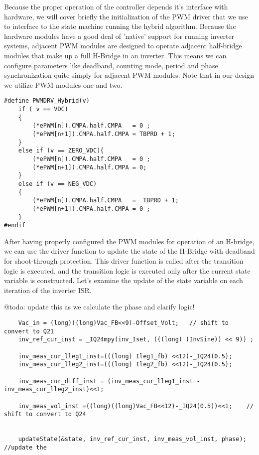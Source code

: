 Because the proper operation of the controller depends it's interface with hardware, we will cover briefly the initialization of the PWM driver that we use to interface to the state machine running the hybrid algorithm. Because the hardware modules have a good deal of 'native' support for running inverter systems, adjacent PWM modules are designed to operate adjacent half-bridge modules that make up a full H-Bridge in an inverter. This means we can configure parameters like deadband, counting mode, period and phase synchronization quite simply for adjacent PWM modules. Note that in our design we utilize PWM modules one and two. 

\begin{lstlisting}
#define PWMDRV_Hybrid(v)
	if ( v == VDC)
	{
		(*ePWM[n]).CMPA.half.CMPA	= 0 ;
		(*ePWM[n+1]).CMPA.half.CMPA	= TBPRD + 1;
	}
	else if (v == ZERO_VDC){
		(*ePWM[n]).CMPA.half.CMPA	= 0 ;
		(*ePWM[n+1]).CMPA.half.CMPA	= 0;
	}
	else if (v == NEG_VDC)
	{
		(*ePWM[n]).CMPA.half.CMPA	=  TBPRD + 1;
		(*ePWM[n+1]).CMPA.half.CMPA	= 0 ;
	}
#endif
\end{lstlisting}

After having properly configured the PWM modules for operation of an H-bridge, we can use the driver function to update the state of the H-Bridge with deadband for shoot-through protection. This driver function is called after the transition logic is executed, and the transition logic is executed only after the current state variable is constructed. Let's examine the update of the state variable on each iteration of the inverter ISR. 

@todo: update this as we calculate the phase and clarify logic!
\begin{lstlisting}
	Vac_in = (long)((long)Vac_FB<<9)-Offset_Volt;	// shift to convert to Q21
	inv_ref_cur_inst = _IQ24mpy(inv_Iset, (((long) (InvSine)) << 9)) ;

	inv_meas_cur_lleg1_inst=(((long) Ileg1_fb) <<12)-_IQ24(0.5);
	inv_meas_cur_lleg2_inst=(((long) Ileg2_fb) <<12)-_IQ24(0.5);

	inv_meas_cur_diff_inst = (inv_meas_cur_lleg1_inst - inv_meas_cur_lleg2_inst)<<1;

	inv_meas_vol_inst =((long)((long)Vac_FB<<12)-_IQ24(0.5))<<1;	// shift to convert to Q24


	updateState(&state, inv_ref_cur_inst, inv_meas_vol_inst, phase);		//update the
\end{lstlisting}
 
